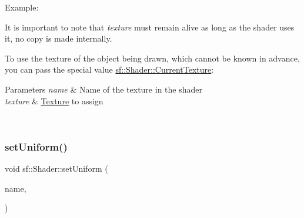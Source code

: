 Example\+: 
\begin{DoxyCode}{0}
\end{DoxyCode}
 
\begin{DoxyCode}{0}
\end{DoxyCode}
 It is important to note that {\itshape texture} must remain alive as long as the shader uses it, no copy is made internally.

To use the texture of the object being drawn, which cannot be known in advance, you can pass the special value \mbox{\hyperlink{classsf_1_1_shader_ac84c7953eec2e19358ea6e2cc5385b8d}{sf\+::\+Shader\+::\+Current\+Texture}}\+: 
\begin{DoxyCode}{0}
\end{DoxyCode}



\begin{DoxyParams}{Parameters}
{\em name} & Name of the texture in the shader \\
\hline
{\em texture} & \mbox{\hyperlink{classsf_1_1_texture}{Texture}} to assign \begin{DoxyVerb}\end{DoxyVerb}
 \\
\hline
\end{DoxyParams}
\mbox{\label{classsf_1_1_shader_ab18f531e1f726b88fec1cf5a1e6af26d}} 
\subsubsection{\texorpdfstring{setUniform()}{setUniform()}\hspace{0.1cm}{\footnotesize\ttfamily [16/16]}}
{\footnotesize\ttfamily void sf\+::\+Shader\+::set\+Uniform (\begin{DoxyParamCaption}\item[{const std\+::string \&}]{name,  }\item[{\mbox{\hyperlink{structsf_1_1_shader_1_1_current_texture_type}{Current\+Texture\+Type}}}]{ }\end{DoxyParamCaption})}



